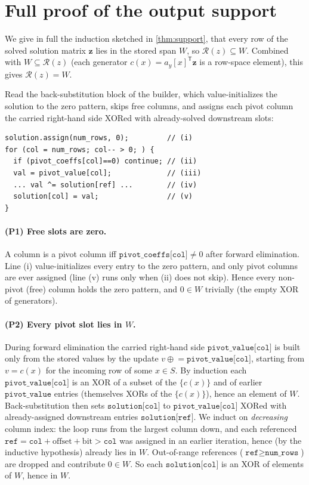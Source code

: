 \documentclass[sigconf,nonacm,anonymous,balance=false]{acmart}
\newcommand{\W}{W}                          %
\newcommand{\Rz}{\mathcal{R}(z)}            %
\newcommand{\bz}{\mathbf{z}}                %
\newcommand{\ay}{a_y}                       %
\newcommand{\cx}{c(x)}                      %
\begin{document}
\section{Full proof of the output support}
\label{app:proofs}

We give in full the induction sketched in \cref{thm:support}, that every row of the solved
solution matrix $\bz$ lies in the stored span $\W$, so $\Rz \subseteq \W$. Combined with
$\W \subseteq \Rz$ (each generator $\cx = \ay[x]^{\mathsf T}\bz$ is a row-space element), this
gives $\Rz = \W$.

Read the back-substitution block of the builder, which value-initializes the solution to the zero
pattern, skips free columns, and assigns each pivot column the carried right-hand side XORed with
already-solved downstream slots:
{\footnotesize
\begin{verbatim}
solution.assign(num_rows, 0);         // (i)
for (col = num_rows; col-- > 0; ) {
  if (pivot_coeffs[col]==0) continue; // (ii)
  val = pivot_value[col];             // (iii)
  ... val ^= solution[ref] ...        // (iv)
  solution[col] = val;                // (v)
}
\end{verbatim}
}

\paragraph{(P1) Free slots are zero.}
A column is a pivot column iff $\texttt{pivot\_coeffs[col]} \ne 0$ after forward elimination. Line
(i) value-initializes every entry to the zero pattern, and only pivot columns are ever assigned
(line (v) runs only when (ii) does not skip). Hence every non-pivot (free) column holds the zero
pattern, and $0 \in \W$ trivially (the empty XOR of generators).

\paragraph{(P2) Every pivot slot lies in $\W$.}
During forward elimination the carried right-hand side $\texttt{pivot\_value[col]}$ is built only
from the stored values by the update $v \mathrel{\oplus}= \texttt{pivot\_value[col]}$, starting from
$v = \cx$ for the incoming row of some $x \in S$. By induction each $\texttt{pivot\_value[col]}$ is
an XOR of a subset of the $\{\cx\}$ and of earlier $\texttt{pivot\_value}$ entries (themselves XORs
of the $\{\cx\}$), hence an element of $\W$. Back-substitution then sets $\texttt{solution[col]}$ to
$\texttt{pivot\_value[col]}$ XORed with already-assigned downstream entries
$\texttt{solution[ref]}$. We induct on \emph{decreasing} column index: the loop runs from the
largest column down, and each referenced $\texttt{ref} = \texttt{col} + \mathrm{offset} + \mathrm{bit}
> \texttt{col}$ was assigned in an earlier iteration, hence (by the inductive hypothesis) already
lies in $\W$. Out-of-range references ($\texttt{ref} \ge \texttt{num\_rows}$) are dropped and
contribute $0 \in \W$. So each $\texttt{solution[col]}$ is an XOR of elements of $\W$, hence in $\W$.
\end{document}
